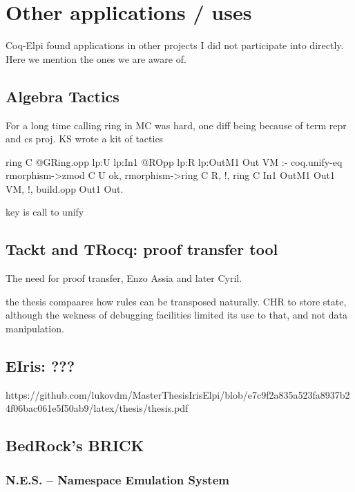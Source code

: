 \documentclass[a4paper, 11pt]{book}
\begin{document}
\section{Other applications / uses}

Coq-Elpi found applications in other projects I did not participate
into directly. Here we mention the ones we are aware of.

\subsection{Algebra Tactics}

For a long time calling ring in MC was hard, one diff
being because of term
repr and cs proj. KS wrote a kit of tactics

\cite{sakaguchi:LIPIcs.ITP.2022.29}

\begin{elpicode}
ring C {{ @GRing.opp lp:U lp:In1 }} {{ @ROpp lp:R lp:OutM1 }} Out VM :-
  coq.unify-eq { rmorphism->zmod C } U ok,
  rmorphism->ring C R, !,
  ring C In1 OutM1 Out1 VM, !,
  build.opp Out1 Out.  
\end{elpicode}

key is call to unify

\subsection{Tackt and TRocq: proof transfer tool}

The need for proof transfer, Enzo Assia and later Cyril.

\cite{DBLP:conf/cpp/Blot0CPKMV23}
\cite{10.1007/978-3-031-57262-3_10}

the thesis compaares how rules can be transposed naturally.
CHR to store state, although the wekness of debugging
facilities limited its use to that, and not data manipulation.

\subsection{EIris: ???}

https://github.com/lukovdm/MasterThesisIrisElpi/blob/e7c9f2a835a523fa8937b24f06bac061e5f50ab9/latex/thesis/thesis.pdf

\subsection{BedRock's BRICK}
\subsubsection{N.E.S. -- Namespace Emulation System}
\end{document}
